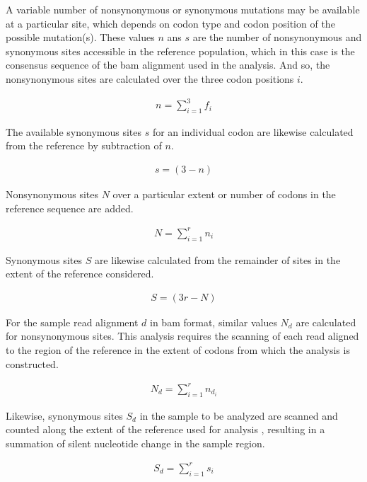 A variable number of nonsynonymous or synonymous mutations may be available at a particular site, which depends on codon type and codon position of the possible mutation(s). These
values $n$ ans $s$ are the number of nonsynonymous and synonymous sites accessible in the reference population, which in this case is the 
consensus sequence of the \gls{bam} alignment used in the analysis. And so, the nonsynonymous sites are calculated over the three codon positions $i$.

	\begin{align*}
	n = \sum _{ {i=1}  }^{3}{f_i}
	\end{align*}

The available synonymous sites $s$ for an individual codon are likewise calculated from the reference by subtraction of $n$.
	
	\begin{align*}
	s=(3-n)
	\end{align*}
	
Nonsynonymous sites $N$ over a particular extent or number of codons in the reference sequence are added.
	
	\begin{align*}
	N = \sum _{ {i=1}  }^{r}{n_i}
	\end{align*}

Synonymous sites $S$ are likewise calculated from the remainder of sites in the extent of the reference considered.	
	
	\begin{align*}
	S=(3r-N)
	\end{align*}

For the sample read alignment $d$ in \gls{bam} format, similar values $N_d$ are calculated for nonsynonymous sites. This analysis requires the scanning
of each read aligned to the region of the reference in the extent of codons from which the analysis is constructed.
	
	\begin{align*}
	N_d = \sum _{ {i=1}  }^{r}{n_{d_i}}
	\end{align*}

Likewise, synonymous sites $S_d$ in the sample to be analyzed are scanned and counted along the extent of the reference used for analysis
, resulting in a summation of silent nucleotide change in the sample region.
	
	\begin{align*}
	S_d = \sum _{ {i=1}  }^{r}{s_i}
	\end{align*}
	
